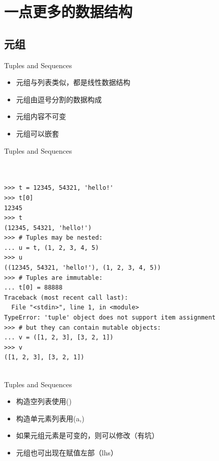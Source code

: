 \documentclass{beamer}
\begin{document}
\section{一点更多的数据结构}
\label{sec:一点更多的数据结构}

\subsection{元组}
\label{ssub:元组}

\begin{frame}[t]{Tuples and Sequences}

    \begin{itemize}
        \item 元组与列表类似，都是线性数据结构
        \item 元组由逗号分割的数据构成
        \item 元组内容不可变
        \item 元组可以嵌套
    \end{itemize}

\end{frame}



\begin{frame}[t,fragile]{Tuples and Sequences}

    \scriptsize

\begin{verbatim}


>>> t = 12345, 54321, 'hello!'
>>> t[0]
12345
>>> t
(12345, 54321, 'hello!')
>>> # Tuples may be nested:
... u = t, (1, 2, 3, 4, 5)
>>> u
((12345, 54321, 'hello!'), (1, 2, 3, 4, 5))
>>> # Tuples are immutable:
... t[0] = 88888
Traceback (most recent call last):
  File "<stdin>", line 1, in <module>
TypeError: 'tuple' object does not support item assignment
>>> # but they can contain mutable objects:
... v = ([1, 2, 3], [3, 2, 1])
>>> v
([1, 2, 3], [3, 2, 1])


\end{verbatim}
\end{frame}





\begin{frame}[t]{Tuples and Sequences}

    \begin{itemize}
        \item 构造空列表使用()
        \item 构造单元素列表用(a,)
        \item 如果元组元素是可变的，则可以修改（有坑）
        \item 元组也可出现在赋值左部（lhs）
    \end{itemize}

\end{frame}
\end{document}
